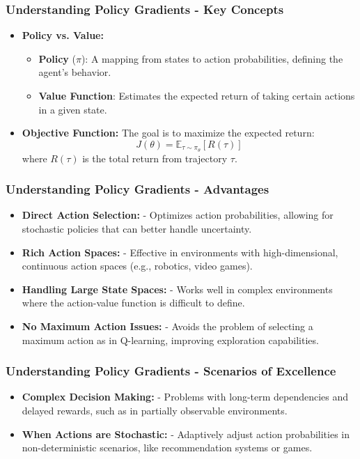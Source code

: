 \documentclass{beamer}
\begin{document}
\begin{frame}[fragile]
    \frametitle{Understanding Policy Gradients - Key Concepts}
    \begin{itemize}
        \item \textbf{Policy vs. Value:}
        \begin{itemize}
            \item \textbf{Policy} ($\pi$): A mapping from states to action probabilities, defining the agent's behavior.
            \item \textbf{Value Function}: Estimates the expected return of taking certain actions in a given state.
        \end{itemize}
        \item \textbf{Objective Function:}
        The goal is to maximize the expected return:
        \begin{equation}
            J(\theta) = \mathbb{E}_{\tau \sim \pi_\theta} \left[ R(\tau) \right]
        \end{equation}
        where $R(\tau)$ is the total return from trajectory $\tau$.
    \end{itemize}
\end{frame}

\begin{frame}[fragile]
    \frametitle{Understanding Policy Gradients - Advantages}
    \begin{itemize}
        \item \textbf{Direct Action Selection:} 
            - Optimizes action probabilities, allowing for stochastic policies that can better handle uncertainty.
        \item \textbf{Rich Action Spaces:}
            - Effective in environments with high-dimensional, continuous action spaces (e.g., robotics, video games).
        \item \textbf{Handling Large State Spaces:}
            - Works well in complex environments where the action-value function is difficult to define.
        \item \textbf{No Maximum Action Issues:}
            - Avoids the problem of selecting a maximum action as in Q-learning, improving exploration capabilities.
    \end{itemize}
\end{frame}

\begin{frame}[fragile]
    \frametitle{Understanding Policy Gradients - Scenarios of Excellence}
    \begin{itemize}
        \item \textbf{Complex Decision Making:}
            - Problems with long-term dependencies and delayed rewards, such as in partially observable environments.
        \item \textbf{When Actions are Stochastic:}
            - Adaptively adjust action probabilities in non-deterministic scenarios, like recommendation systems or games.
    \end{itemize}
\end{frame}
\end{document}
